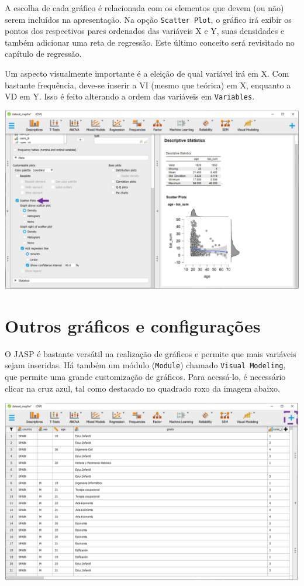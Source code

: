 \documentclass[
]{book}
\begin{document}
A escolha de cada gráfico é relacionada com os elementos que devem (ou não) serem incluídos na apresentação. Na opção \texttt{Scatter\ Plot}, o gráfico irá exibir os pontos dos respectivos pares ordenados das variáveis X e Y, suas densidades e também adicionar uma reta de regressão. Este último conceito será revisitado no capítulo de regressão.

Um aspecto visualmente importante é a eleição de qual variável irá em X. Com bastante frequência, deve-se inserir a VI (mesmo que teórica) em X, enquanto a VD em Y. Isso é feito alterando a ordem das variáveis em \texttt{Variables}.

\includegraphics{./img/cap_desc_jasp_grafico_scatter3.png}

\hypertarget{outros-gruxe1ficos-e-configurauxe7uxf5es-1}{%
\section{Outros gráficos e configurações}\label{outros-gruxe1ficos-e-configurauxe7uxf5es-1}}

O JASP é bastante versátil na realização de gráficos e permite que mais variáveis sejam inseridas. Há também um módulo (\texttt{Module}) chamado \texttt{Visual\ Modeling}, que permite uma grande customização de gráficos. Para acessá-lo, é necessário clicar na cruz azul, tal como destacado no quadrado roxo da imagem abaixo.

\includegraphics{./img/cap_desc_jasp_modules.png}
\end{document}
